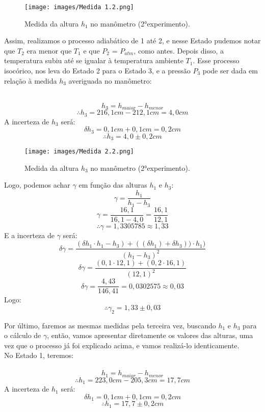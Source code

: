 \begin{figure}[H]
  \centering
  \texttt{[image: images/Medida 1.2.png]}
  \caption{Medida da altura $h_1$ no manômetro (2°experimento).}
\end{figure}

Assim, realizamos o processo adiabático de 1 até 2, e nesse Estado pudemos notar que $T_2$ era menor que $T_1$ e que  $P_2$ = $P_{atm}$, como antes. Depois disso, a temperatura subiu até se igualar à temperatura ambiente $T_1$. Esse processo isocórico, nos leva do Estado 2 para o Estado 3, e a pressão $P_3$ pode ser dada em relação à medida $h_3$ averiguada no manômetro:

\ \[h_3 = h_{maior} - h_{menor} \]
\[\therefore h_3 = 216,1 cm - 212,1 cm  =  4,0 cm\]
A incerteza de $h_3$ será:\\
\[\delta h_3 = 0,1 cm + 0,1 cm =  0,2 cm\]
\[\therefore h_3 = 4,0 \pm 0,2 cm\]


\begin{figure}[H]
  \centering
  \texttt{[image: images/Medida 2.2.png]}
  \caption{Medida da altura $h_3$ no manômetro (2°experimento).}
\end{figure}

Logo, podemos achar $\gamma$ em função das alturas $h_1$ e $h_3$:\\

\[ \gamma = \frac{h_1}{h_1 - h_3}\]
\[ \gamma = \frac{16,1}{16,1 - 4,0} = \frac{16,1}{12,1} \]
\[\therefore \gamma = 1,3305785 \approx 1,33\]
E a incerteza de $\gamma$ será:\\
\[\delta \gamma = \frac{(\delta h_1 \cdot h_1 - h_3)+((\delta h_1) + \delta h_3)) \cdot h_1)}{(h_1 - h_3)^2}\]
\[\delta \gamma = \frac{(0,1 \cdot 12,1)+(0,2 \cdot 16,1)}{(12,1)^2}\]
\[\delta \gamma = \frac{4,43}{146,41} = 0,0302575 \approx 0,03\]
Logo:\\ 
\[\therefore \gamma_2 = 1,33 \pm 0,03 \]

Por último, faremos as mesmas medidas pela terceira vez, buscando $h_1$ e $h_3$ para o cálculo de $\gamma$, então, vamos apresentar diretamente os valores das alturas, uma vez que o processo já foi explicado acima, e vamos realizá-lo identicamente.\\

No Estado 1, teremos:\\

\ \[h_1 = h_{maior} - h_{menor} \]
\[\therefore h_1 = 223,0 cm - 205,3 cm  =  17,7 cm\]
A incerteza de $h_1$ será:\\
\[\delta h_1 = 0,1 cm + 0,1 cm =  0,2 cm\]
\[\therefore h_1 = 17,7 \pm 0,2 cm\]

